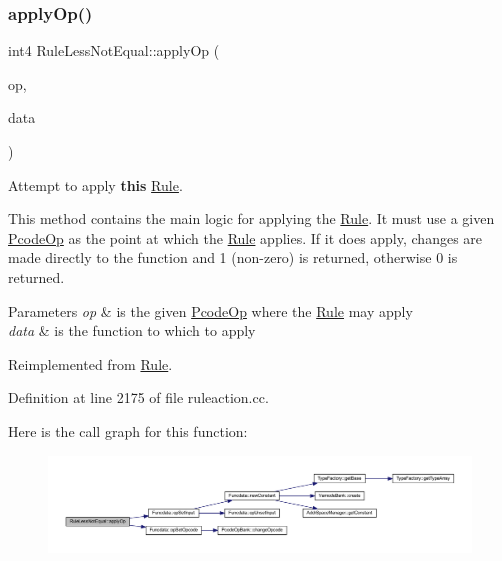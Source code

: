 \subsubsection{\texorpdfstring{applyOp()}{applyOp()}}
{\footnotesize\ttfamily int4 Rule\+Less\+Not\+Equal\+::apply\+Op (\begin{DoxyParamCaption}\item[{\mbox{\hyperlink{class_pcode_op}{Pcode\+Op}} $\ast$}]{op,  }\item[{\mbox{\hyperlink{class_funcdata}{Funcdata}} \&}]{data }\end{DoxyParamCaption})\hspace{0.3cm}{\ttfamily [virtual]}}



Attempt to apply {\bfseries{this}} \mbox{\hyperlink{class_rule}{Rule}}. 

This method contains the main logic for applying the \mbox{\hyperlink{class_rule}{Rule}}. It must use a given \mbox{\hyperlink{class_pcode_op}{Pcode\+Op}} as the point at which the \mbox{\hyperlink{class_rule}{Rule}} applies. If it does apply, changes are made directly to the function and 1 (non-\/zero) is returned, otherwise 0 is returned. 
\begin{DoxyParams}{Parameters}
{\em op} & is the given \mbox{\hyperlink{class_pcode_op}{Pcode\+Op}} where the \mbox{\hyperlink{class_rule}{Rule}} may apply \\
\hline
{\em data} & is the function to which to apply \\
\hline
\end{DoxyParams}


Reimplemented from \mbox{\hyperlink{class_rule_a4e3e61f066670175009f60fb9dc60848}{Rule}}.



Definition at line 2175 of file ruleaction.\+cc.

Here is the call graph for this function\+:
\nopagebreak
\begin{figure}[H]
\begin{center}
\leavevmode
\includegraphics[width=350pt]{class_rule_less_not_equal_a08fa964bfe43c6783d801d5c33d46d7a_cgraph}
\end{center}
\end{figure}
\mbox{\label{class_rule_less_not_equal_a8e163306125fbd3f7c5f507ef84cc4d4}} 
